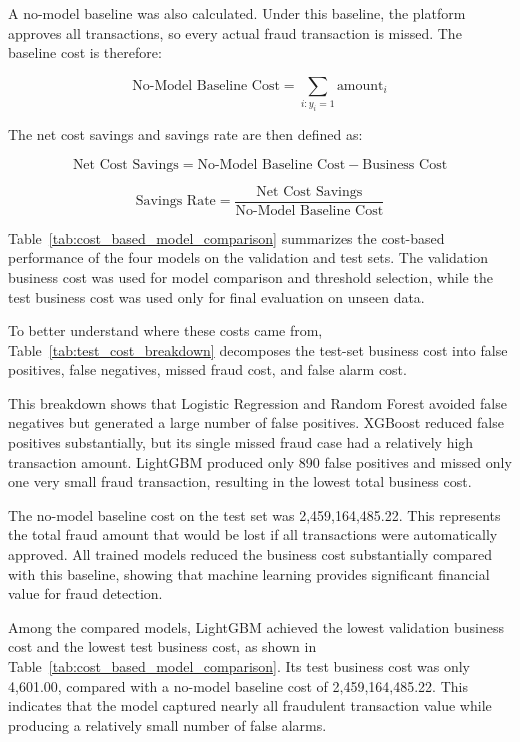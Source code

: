 A no-model baseline was also calculated. Under this baseline, the platform approves all transactions, so every actual fraud transaction is missed. The baseline cost is therefore:

\[
\text{No-Model Baseline Cost}
=
\sum_{i: y_i = 1} \text{amount}_i
\]

The net cost savings and savings rate are then defined as:

\[
\text{Net Cost Savings}
=
\text{No-Model Baseline Cost}
-
\text{Business Cost}
\]

\[
\text{Savings Rate}
=
\frac{\text{Net Cost Savings}}{\text{No-Model Baseline Cost}}
\]

Table~\ref{tab:cost_based_model_comparison} summarizes the cost-based performance of the four models on the validation and test sets. The validation business cost was used for model comparison and threshold selection, while the test business cost was used only for final evaluation on unseen data.



To better understand where these costs came from, Table~\ref{tab:test_cost_breakdown} decomposes the test-set business cost into false positives, false negatives, missed fraud cost, and false alarm cost.



This breakdown shows that Logistic Regression and Random Forest avoided false negatives but generated a large number of false positives. XGBoost reduced false positives substantially, but its single missed fraud case had a relatively high transaction amount. LightGBM produced only 890 false positives and missed only one very small fraud transaction, resulting in the lowest total business cost.

The no-model baseline cost on the test set was 2,459,164,485.22. This represents the total fraud amount that would be lost if all transactions were automatically approved. All trained models reduced the business cost substantially compared with this baseline, showing that machine learning provides significant financial value for fraud detection.

Among the compared models, LightGBM achieved the lowest validation business cost and the lowest test business cost, as shown in Table~\ref{tab:cost_based_model_comparison}. Its test business cost was only 4,601.00, compared with a no-model baseline cost of 2,459,164,485.22. This indicates that the model captured nearly all fraudulent transaction value while producing a relatively small number of false alarms.

